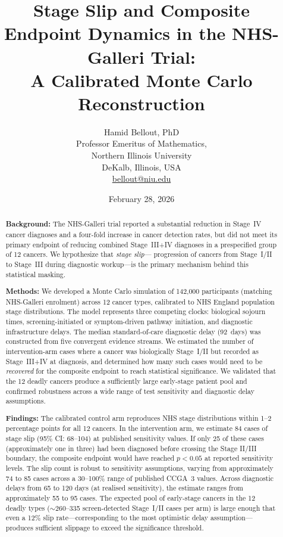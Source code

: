 \documentclass[11pt,letter]{article}
\title{\textbf{Stage Slip and Composite Endpoint Dynamics in the NHS-Galleri
 Trial:} \\ [0.3em]\large   A Calibrated Monte Carlo Reconstruction}
\author{
  Hamid Bellout, PhD\\[0.5em]
  \small Professor Emeritus of Mathematics,\\
   \small Northern Illinois University\\
  \small DeKalb, Illinois, USA\\
  \small \href{mailto:bellout@niu.edu}{bellout@niu.edu} \\
}
\date{February 28, 2026}
\begin{document}
\maketitle

\begin{abstract}
\noindent\textbf{Background:}
The NHS-Galleri trial reported a substantial reduction in Stage~IV cancer
diagnoses and a four-fold increase in cancer detection rates, but did not
meet its primary endpoint of reducing combined Stage~III+IV diagnoses in a
prespecified group of 12 cancers. We hypothesize that \textit{stage slip}---
progression of cancers from Stage~I/II to Stage~III during diagnostic
workup---is the primary mechanism behind this statistical masking.

\noindent\textbf{Methods:}
We developed a Monte Carlo simulation of 142,000 participants (matching NHS-Galleri
enrolment) across 12
cancer types, calibrated to NHS England population stage distributions.
The model represents three competing clocks: biological sojourn times,
screening-initiated or symptom-driven pathway initiation, and diagnostic
infrastructure delays. The median standard-of-care diagnostic delay
(92~days) was constructed from five convergent evidence streams. We
estimated the number of intervention-arm cases where a cancer was
biologically Stage~I/II but recorded as Stage~III+IV at diagnosis, and
determined how many such cases would need to be {\em recovered} for the
composite endpoint to reach statistical significance. We validated that
the 12 deadly cancers produce a sufficiently large early-stage patient
pool and confirmed robustness across a wide range of test sensitivity and
diagnostic delay assumptions.

\noindent\textbf{Findings:}
The calibrated control arm reproduces NHS stage distributions within 1--2
percentage points for all 12 cancers. In the intervention arm, we estimate
84 cases of stage slip (95\% CI: 68--104) at published sensitivity values.
If only 25 of these cases (approximately one in three) had been diagnosed 
before crossing the Stage II/III boundary, the composite endpoint 
would have reached $p < 0.05$ at reported sensitivity levels.
The slip count is robust to sensitivity assumptions, varying from 
approximately 74 to 85 cases across a 30–100\% range of published CCGA~3 
values. Across diagnostic delays from 65 to 120 days (at realised sensitivity),
 the estimate ranges from approximately 55 to 95 cases.
The expected pool of early-stage cancers in the
12 deadly types (${\sim}260$--335 screen-detected Stage~I/II cases per arm)
is large enough that even a 12\% slip rate---corresponding to the most
optimistic delay assumption---produces sufficient slippage to exceed the
significance threshold.


\end{abstract}
\end{document}
